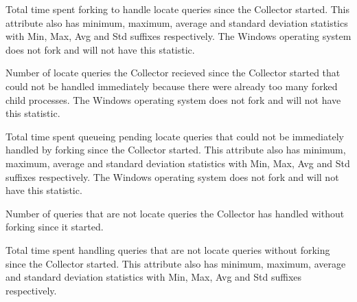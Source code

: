 \begin{description}
\item[\AdAttr{HandleLocateForkedRuntime}:] Total time spent forking to handle locate queries since the Collector started.
This attribute also has minimum, maximum, average and standard deviation statistics with Min, Max, Avg and Std suffixes respectively.
The Windows operating system does not fork and will not have this statistic.

\item[\AdAttr{HandleLocateMissedFork}:] Number of locate queries the Collector 
recieved since the Collector started that could not be handled immediately because there were already too many forked child processes.
The Windows operating system does not fork and will not have this statistic.

\item[\AdAttr{HandleLocateMissedForkRuntime}:] Total time spent queueing pending locate queries that could not be immediately handled by forking since the Collector started.
This attribute also has minimum, maximum, average and standard deviation statistics with Min, Max, Avg and Std suffixes respectively.
The Windows operating system does not fork and will not have this statistic.

\item[\AdAttr{HandleQuery}:] Number of queries that are not locate queries the Collector has handled without forking since it started.

\item[\AdAttr{HandleQueryRuntime}:] Total time spent handling queries that are not locate queries without forking since the Collector started.
This attribute also has minimum, maximum, average and standard deviation statistics with Min, Max, Avg and Std suffixes respectively.


\end{description}
